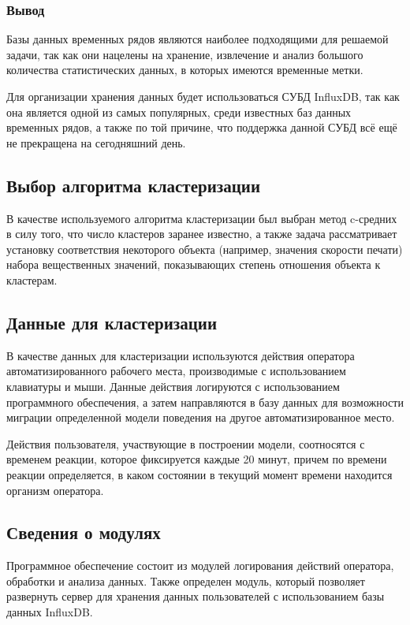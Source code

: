 \subsubsection*{Вывод}
Базы данных временных рядов являются наиболее подходящими для решаемой задачи, так как они нацелены на хранение, извлечение и анализ большого количества статистических данных, в которых имеются временные метки.

Для организации хранения данных будет использоваться СУБД InfluxDB, так как она является одной из самых популярных, среди известных баз данных временных рядов, а также по той причине, что поддержка данной СУБД всё ещё не прекращена на сегодняшний день.

\subsection{Выбор алгоритма кластеризации}
В качестве используемого алгоритма кластеризации был выбран метод c-средних в силу того, что число кластеров заранее известно, а также задача рассматривает установку соответствия некоторого объекта (например, значения скорости печати) набора вещественных значений, показывающих степень отношения объекта к кластерам.

\subsection{Данные для кластеризации}
В качестве данных для кластеризации используются действия оператора автоматизированного рабочего места, производимые с использованием клавиатуры и мыши. Данные действия логируются с использованием программного обеспечения, а затем направляются в базу данных для возможности миграции определенной модели поведения на другое автоматизированное место.

Действия пользователя, участвующие в построении модели, соотносятся с временем реакции, которое фиксируется каждые 20 минут, причем по времени реакции определяется, в каком состоянии в текущий момент времени находится организм оператора.

\subsection{Сведения о модулях}
Программное обеспечение состоит из модулей логирования действий оператора, обработки и анализа данных. Также определен модуль, который позволяет развернуть сервер для хранения данных пользователей с использованием базы данных InfluxDB.

